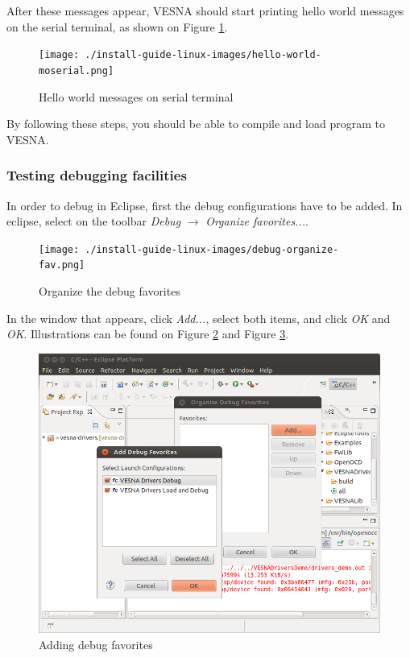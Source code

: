 \documentclass[a4paper, 10pt]{article}
\begin{document}
After these messages appear, VESNA should start printing hello world messages
on the serial terminal, as shown on Figure \ref{fig:hello-world}.

    \begin{figure}[H]
    \centering
        \texttt{[image: ./install-guide-linux-images/hello-world-moserial.png]}
        \caption{Hello world messages on serial terminal}
        \label{fig:hello-world}
    \end{figure}


By following these steps, you should be able to compile and load program to VESNA.

\subsubsection{Testing debugging facilities}

In order to debug in Eclipse, first the debug configurations have to be added.
In eclipse, select on the toolbar \emph{Debug} $\rightarrow$ \emph{Organize favorites...}.

    \begin{figure}[H]
    \centering
        \texttt{[image: ./install-guide-linux-images/debug-organize-fav.png]}
        \caption{Organize the debug favorites}
        \label{fig:debug-org-fav}
    \end{figure}


In the window that appears, click \emph{Add...},
select both items, and click \emph{OK} and \emph{OK}. Illustrations can be found on
Figure \ref{fig:debug-org-fav} and Figure \ref{fig:debug-add-fav}.

    \begin{figure}[H]
    \centering
        \includegraphics[width=\textwidth]{./install-guide-linux-images/debug-add-fav.png}
        \caption{Adding debug favorites}
        \label{fig:debug-add-fav}
    \end{figure}
\end{document}
